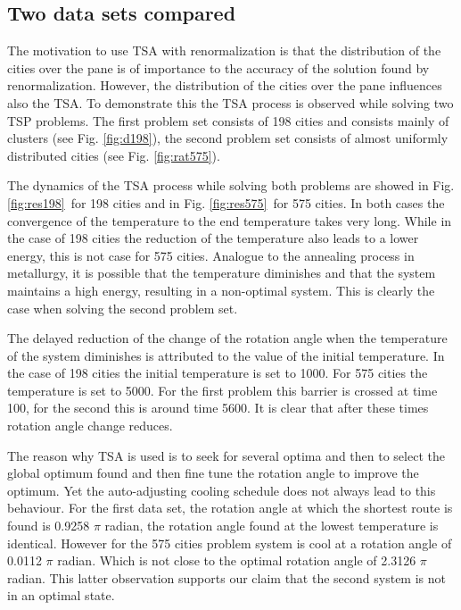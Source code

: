 

\subsection{Two data sets compared}
The motivation to use TSA with renormalization is that the distribution of the
cities over the pane is of importance to the accuracy of the solution found by
renormalization. However, the distribution of the cities over the pane
influences also the TSA. To demonstrate this the TSA process is observed
while solving two TSP problems. The first problem set consists of
198 cities and consists mainly of clusters (see Fig. \ref{fig:d198}), the
second problem set consists of almost uniformly distributed cities (see Fig.
\ref{fig:rat575}).

The dynamics of the TSA process while solving both problems are showed in Fig.
\ref{fig:res198}~for 198 cities and in Fig. \ref{fig:res575}~for 575 cities.
In both cases the convergence of the temperature to the end temperature takes
very long. While in the case of 198 cities the reduction of the temperature
also leads to a lower energy, this is not case for 575 cities. Analogue to the
annealing process in metallurgy, it is possible that the temperature
diminishes and that the system maintains a high energy, resulting in a
non-optimal system. This is clearly the case when solving the second problem set.

The delayed reduction of the change of the rotation angle when the temperature
of the system diminishes is attributed to the value of the initial
temperature. In the case of 198 cities the initial temperature is set to 1000.
For 575 cities the temperature is set to 5000. For the first problem this
barrier is crossed at time 100, for the second this is around time 5600.  It
is clear that after these times rotation angle change reduces.

The reason why TSA is used is to seek for several optima and then to select
the global optimum found and then fine tune the rotation angle to improve the
optimum. Yet the auto-adjusting cooling schedule does not always lead to this
behaviour. For the first data set, the rotation angle at which the shortest
route is found is 0.9258 $\pi$ radian, the rotation angle found at the lowest
temperature is identical. However for the 575 cities problem system is cool at
a rotation angle of 0.0112 $\pi$ radian. Which is not close to the optimal rotation
angle of 2.3126 $\pi$ radian. This latter observation supports our claim that the
second system is not in an optimal state.

